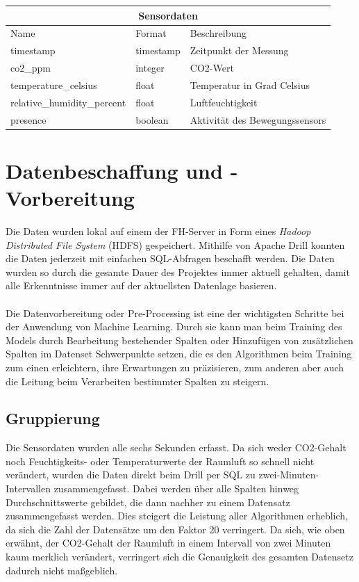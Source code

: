 \begin{tabular}{|p{4.5cm}||p{3cm}|p{7cm}|}
    \hline
    \multicolumn{3}{|c|}{Sensordaten} \\
    \hline
    Name&Format &Beschreibung\\
    \hline
    timestamp&timestamp&Zeitpunkt der Messung\\
    co2\_ppm&integer&CO2-Wert\\
    temperature\_celsius&float&Temperatur in Grad Celsius\\
    relative\_humidity\_percent&float&Luftfeuchtigkeit\\
    presence&boolean&Aktivität des Bewegungssensors\\
    \hline
\end{tabular}     

\section{Datenbeschaffung und -Vorbereitung}
Die Daten wurden lokal auf einem der FH-Server in Form eines \textit{Hadoop Distributed File System} (HDFS) 
gespeichert. Mithilfe von Apache Drill konnten die Daten jederzeit mit einfachen SQL-Abfragen beschafft werden. 
Die Daten wurden so durch die gesamte Dauer des Projektes immer aktuell gehalten, damit alle Erkenntnisse 
immer auf der aktuellsten Datenlage basieren.
\\\\
Die Datenvorbereitung oder Pre-Processing ist eine der wichtigsten Schritte bei der Anwendung von Machine 
Learning. Durch sie kann man beim Training des Models durch Bearbeitung bestehender Spalten oder Hinzufügen 
von zusätzlichen Spalten im Datenset Schwerpunkte setzen, die es den Algorithmen beim Training zum einen 
erleichtern, ihre Erwartungen zu präzisieren, zum anderen aber auch die Leitung beim Verarbeiten bestimmter 
Spalten zu steigern.
\subsection{Gruppierung}
Die Sensordaten wurden alle sechs Sekunden erfasst. Da sich weder CO2-Gehalt noch Feuchtigkeits- oder 
Temperaturwerte der Raumluft so schnell nicht verändert, wurden die Daten direkt beim Drill per SQL zu 
zwei-Minuten-Intervallen zusammengefasst. Dabei werden über alle Spalten hinweg Durchschnittswerte gebildet, 
die dann nachher zu einem Datensatz zusammengefasst werden. 
Dies steigert die Leistung aller Algorithmen erheblich, da sich die Zahl der 
Datensätze um den Faktor 20 verringert. Da sich, wie oben erwähnt, der CO2-Gehalt der Raumluft in einem 
Intervall von zwei Minuten kaum merklich verändert, verringert sich die Genauigkeit des gesamten Datensetz 
dadurch nicht maßgeblich.
